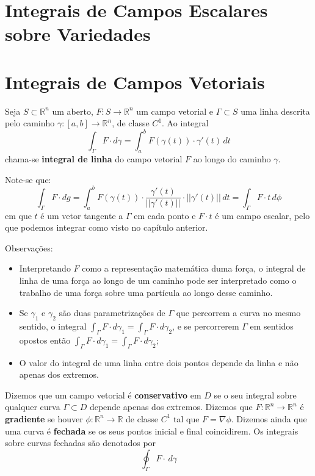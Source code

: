 \documentclass{article}
\newcommand{\R}{\mathbb{R}}
\begin{document}
\section{Integrais de Campos Escalares sobre Variedades}

\section{Integrais de Campos Vetoriais}
Seja $S \subset \R^n$ um aberto, $F: S \to \R^n$ um campo vetorial e $\Gamma \subset S$ uma linha descrita pelo caminho $\gamma: [a,b] \to \R^n$, de classe $C^1$. Ao integral
$$ \int_\Gamma F \cdot d\gamma = \int_a^b F(\gamma(t))\cdot \gamma '(t) \, dt$$
chama-se \textbf{integral de linha} do campo vetorial $F$ ao longo do caminho $\gamma$.

Note-se que:
$$ \int_\Gamma F \cdot dg = \int_a^b F(\gamma(t))\cdot \frac{\gamma'(t)}{||\gamma'(t)||} \cdot ||\gamma'(t)|| \, dt = \int_\Gamma F\cdot t \, d\phi $$
em que $t$ é um vetor tangente a $\Gamma$ em cada ponto e $F \cdot t$ é um campo escalar, pelo que podemos integrar como visto no capítulo anterior.

Observações:
\begin{itemize}
	\item Interpretando $F$ como a representação matemática duma força, o integral de linha de uma força ao longo de um caminho pode ser interpretado como o trabalho de uma força sobre uma partícula ao longo desse caminho.
	\item Se $\gamma_1$ e $\gamma_2$ são duas parametrizações de $\Gamma$ que percorrem a curva no mesmo sentido, o integral $\int_\Gamma F \cdot d\gamma_1 = \int_\Gamma F \cdot d\gamma_2$, e se percorrerem $\Gamma$ em sentidos opostos então $\int_\Gamma F \cdot d\gamma_1 = \int_\Gamma F \cdot d\gamma_2$; 
	\item O valor do integral de uma linha entre dois pontos depende da linha e não apenas dos extremos.
\end{itemize}

Dizemos que um campo vetorial é \textbf{conservativo} em $D$ se o seu integral sobre qualquer curva $\Gamma \subset D$ depende apenas dos extremos. Dizemos que $F:\R^n \to \R^n$ é \textbf{gradiente} se houver $\phi: \R^n \to \R$ de classe $C^1$ tal que $F = \nabla \phi$. Dizemos ainda que uma curva é \textbf{fechada} se os seus pontos inicial e final coincidirem. Os integrais sobre curvas fechadas são denotados por
$$ \oint_\Gamma F \cdot \, d \gamma $$
\end{document}
